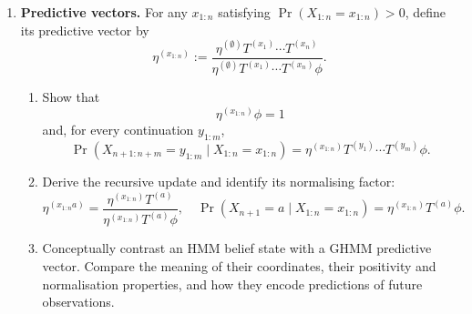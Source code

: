 \documentclass[11pt]{article}
\begin{document}
\begin{exercise}
\begin{enumerate}
    \item \textbf{Predictive vectors.}
      For any $x_{1:n}$ satisfying
      $\Pr(X_{1:n}=x_{1:n})>0$, define its predictive vector by
      \[
        \eta^{(x_{1:n})}
          :=\frac{\eta^{(\emptyset)}
              T^{(x_1)}\cdots T^{(x_n)}}
            {\eta^{(\emptyset)}
              T^{(x_1)}\cdots T^{(x_n)}\phi}.
      \]
      \begin{enumerate}
        \item Show that
          \[
            \eta^{(x_{1:n})}\phi=1
          \]
          and, for every continuation $y_{1:m}$,
          \[
            \Pr(X_{n+1:n+m}=y_{1:m}\mid X_{1:n}=x_{1:n})
              =\eta^{(x_{1:n})}
                T^{(y_1)}\cdots T^{(y_m)}\phi.
          \]

        \item Derive the recursive update and identify its normalising
          factor:
          \[
            \eta^{(x_{1:n}a)}
              =\frac{\eta^{(x_{1:n})}T^{(a)}}
                {\eta^{(x_{1:n})}T^{(a)}\phi},
            \quad
            \Pr(X_{n+1}=a\mid X_{1:n}=x_{1:n})
              =\eta^{(x_{1:n})}T^{(a)}\phi.
          \]

        \item Conceptually contrast an HMM belief state with a GHMM
          predictive vector. Compare the meaning of their coordinates, their
          positivity and normalisation properties, and how they encode
          predictions of future observations.
      \end{enumerate}


\end{enumerate}
\end{exercise}
\end{document}
